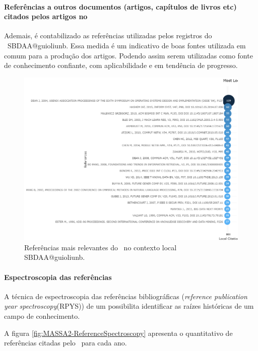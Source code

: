\paragraph{Referências a outros documentos (artigos, capítulos de livros etc) citados pelos artigos no \dataset}

Ademais, é contabilizado as referências utilizadas pelos registros do \dataset\ SBDAA@guioliunb. Essa medida é um indicativo de boas fontes utilizada em comum para a produção dos artigos. Podendo assim serem utilizadas como fonte de conhecimento confiante, com aplicabilidade e em tendência de progresso.  

\begin{figure}
    \centering
    \includegraphics[angle=0,width=1\textwidth]{experiments/guioliunb/AnaliseBibliometrica/SocialBigDataAnalysis/MOST LOCAL CITED DOC.png}
    \caption{Referências mais relevantes do \dataset\ no contexto local   SBDAA@guioliunb.}
    \label{fig:SBDAA@guioliunb:relevantdocuments}
\end{figure}

\paragraph{Espectroscopia das referências}

A técnica de espectroscopia das referências bibliográficas (\textit{reference publication year spectroscopy}(RPYS)) de um \dataset\cite{marx_detecting_2014} possibilita identificar as raízes históricas de um campo de conhecimento. 

A figura \ref{fig:MASSA2-ReferenceSpectroscopy} apresenta o quantitativo de referências citadas pelo \dataset\, para cada ano.

